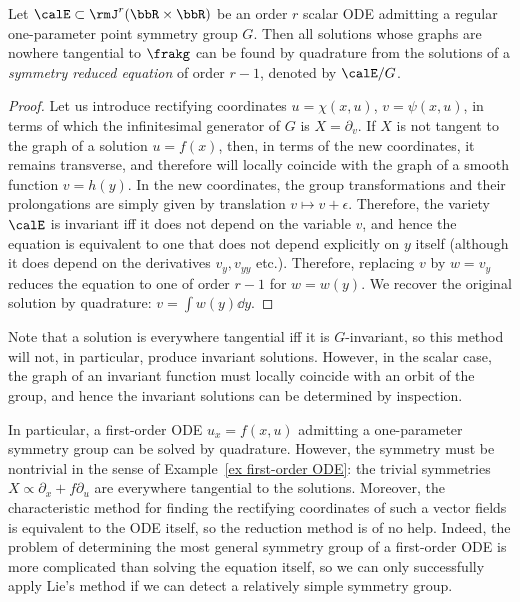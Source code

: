 \begin{thm}\label{thm 6.19 Olver}
    Let $\calE\subset \rmJ^r (\bbR\times\bbR)$ be an order $r$ scalar ODE admitting a regular one-parameter point symmetry group $G$. Then all solutions whose graphs are nowhere tangential to $\frakg$ can be found by quadrature from the solutions of a \emph{symmetry reduced equation} of order $r-1$, denoted by $\calE\slash G$.
\end{thm}
\begin{proof}
    Let us introduce rectifying coordinates $u=\chi(x,u)$, $v=\psi(x,u)$, in terms of which the infinitesimal generator of $G$ is $X=\partial_v$. If $X$ is not tangent to the graph of a solution $u=f(x)$, then, in terms of the new coordinates, it remains transverse, and therefore will locally coincide with the graph of a smooth function $v=h(y)$. In the new coordinates, the group transformations and their prolongations are simply given by translation $v\mapsto v+\epsilon$. Therefore, the variety $\calE$ is invariant iff it does not depend on the variable $v$, and hence the equation is equivalent to one that does not depend explicitly on $y$ itself  (although it does depend on the derivatives $v_y,v_{yy}$ etc.). Therefore, replacing $v$ by $w=v_y$ reduces the equation to one of order $r-1$ for $w=w(y)$. We recover the original solution by quadrature: $v=\int w(y)\dd y$.
\end{proof}

\begin{rem}
    Note that a solution is everywhere tangential iff it is $G$-invariant, so this method will not, in particular, produce invariant solutions. However, in the scalar case, the graph of an invariant function must locally coincide with an orbit of the group, and hence the invariant solutions can be determined by inspection.
\end{rem}

In particular, a first-order ODE $u_x=f(x,u)$ admitting a one-parameter symmetry group can be solved by quadrature. However, the symmetry must be nontrivial in the sense of Example~\ref{ex first-order ODE}: the trivial symmetries $X\propto \partial_x+f\partial_u$ are everywhere tangential to the solutions. Moreover, the characteristic method for finding the rectifying coordinates of such a vector fields is equivalent to the ODE itself, so the reduction method is of no help. Indeed, the problem of determining the most general symmetry group of a first-order ODE is more complicated than solving the equation itself, so we can only successfully apply Lie's method if we can detect a relatively simple symmetry group.

